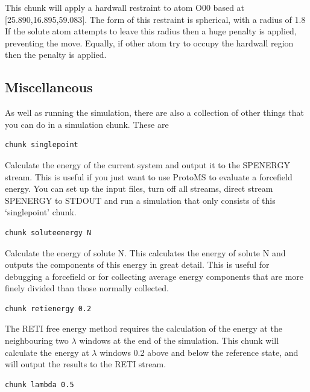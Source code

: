 \documentclass[letterpaper,10pt,english]{sphinxmanual}
\begin{document}
This chunk will apply a hardwall restraint to atom O00 based at {[}25.890,16.895,59.083{]}. The form of this restraint is spherical, with a radius of 1.8 If the solute atom attempts to leave this radius then a huge penalty is applied, preventing the move. Equally, if other atom try to occupy the hardwall region then the penalty is applied.


\subsection{Miscellaneous}
\label{protoms:miscellaneous}
As well as running the simulation, there are also a collection of other things that you can do in a simulation chunk. These are

\begin{Verbatim}[commandchars=\\\{\}]
chunk singlepoint
\end{Verbatim}

Calculate the energy of the current system and output it to the SPENERGY stream. This is useful if you just want to use ProtoMS to evaluate a forcefield energy. You can set up the input files, turn off all streams, direct stream SPENERGY to STDOUT and run a simulation that only consists of this ‘singlepoint’ chunk.

\begin{Verbatim}[commandchars=\\\{\}]
chunk soluteenergy N
\end{Verbatim}

Calculate the energy of solute N. This calculates the energy of solute N and outputs the components of this energy in great detail. This is useful for debugging a forcefield or for collecting average energy components that are more finely divided than those normally collected.

\begin{Verbatim}[commandchars=\\\{\}]
chunk retienergy 0.2
\end{Verbatim}

The RETI free energy method requires the calculation of the energy at the neighbouring two \(\lambda\) windows at the end of the simulation. This chunk will calculate the energy at \(\lambda\) windows 0.2 above and below the reference state, and will output the results to the RETI stream.

\begin{Verbatim}[commandchars=\\\{\}]
chunk lambda 0.5
\end{Verbatim}
\end{document}
